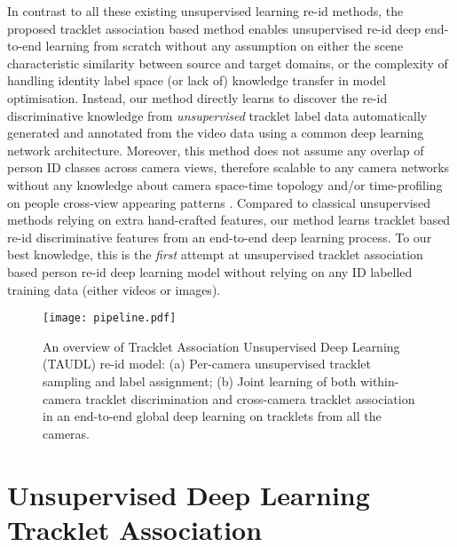 \documentclass[runningheads]{llncs}
\begin{document}
In contrast to all these existing unsupervised learning re-id methods,
the proposed tracklet association based method enables unsupervised
re-id deep end-to-end learning from scratch without any assumption on either the 
scene characteristic similarity between source and target domains, or the complexity of
handling identity label space (or lack of) knowledge
transfer in model optimisation.
Instead, our method directly learns to discover the re-id discriminative knowledge
from {\em unsupervised} tracklet label data automatically generated
and annotated from the video data using a common deep learning network architecture.
Moreover, this method does not assume any overlap of person ID classes across camera views,
therefore scalable to any camera networks without any knowledge about
camera space-time topology and/or time-profiling on people cross-view
appearing patterns \cite{loy_ijcv2010}.
Compared to classical unsupervised methods relying on extra hand-crafted features,
our method learns tracklet based re-id discriminative features from an
end-to-end deep learning process. 
To our best knowledge, this is the {\em first} attempt at unsupervised
tracklet association based person re-id deep learning model without
relying on any ID labelled training data (either videos or images).


\begin{figure}[t]
	\centering
	\texttt{[image: pipeline.pdf]}
	\caption{
		An overview of {Tracklet Association Unsupervised Deep Learning} 
		(TAUDL) re-id model: (a) Per-camera unsupervised
                tracklet sampling and label assignment; (b) Joint
                learning of both within-camera tracklet discrimination and
                cross-camera tracklet association in an end-to-end
                global deep learning on tracklets from all the cameras. 
	}
	\label{fig:pipeline}
\end{figure}



\section{Unsupervised Deep Learning Tracklet Association} \label{sec:method}
\end{document}
